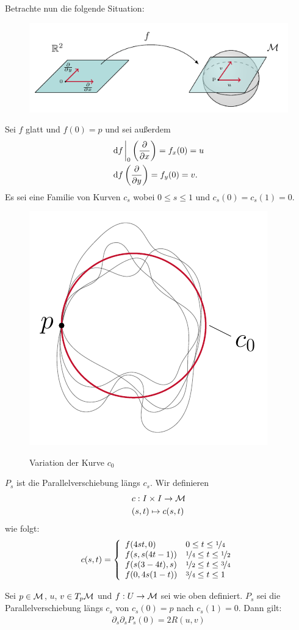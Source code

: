 Betrachte nun die folgende Situation:
\begin{figure}[H]
\centering
\includegraphics[width=1\linewidth]{figures/tikz/coordinates_r2_manifold.pdf}
\label{img:coordinates_r2_manifold}
\end{figure} 


Sei $f$ glatt und $f(0)=p$ und sei außerdem
\begin{align}
& \dd f \eval_0 \left( \pdv{x} \right) = f_x (0) = u\\
& \dd f \left( \pdv{y}\right) = f_y(0) = v.
\end{align}
Es sei eine Familie von Kurven $c_s$ wobei $0 \leq s \leq 1$ und $c_s (0) = c_s(1) = 0$.
\begin{figure}[H]
\centering
\includegraphics[width=0.4\linewidth]{figures/tikz/variantion_of_closed_curve.pdf}
\label{img:variantion_of_closed_curve}
\caption{Variation der Kurve $c_0$}
\end{figure} 

$P_s$ ist die Parallelverschiebung längs $c_s$.
Wir definieren
\begin{align}
&c : I \times I \to \mathcal{M}\\
&(s, t) \mapsto c(s,t)
\end{align}
wie folgt:
\begin{align}
c(s, t) = \left\{
\begin{array}{ll}
f(4 s t, 0) & 0 \leq t \leq \nicefrac{1}{4} \\
f(s, s(4t-1)) & \nicefrac{1}{4} \leq t \leq \nicefrac{1}{2}\\
f(s(3-4t), s) & \nicefrac{1}{2} \leq t \leq \nicefrac{3}{4}\\
f(0, 4s(1-t)) & \nicefrac{3}{4} \leq t \leq 1
\end{array}
\right. 
\end{align}
\begin{satz}
Sei $p \in \mathcal{M}$, $u$, $v \in T_p \mathcal{M}$ und $f: U \to \mathcal{M}$ sei wie oben definiert.
$P_s$ sei die Parallelverschiebung längs $c_s$ von $c_s(0) = p$ nach $c_s(1) = 0$.
Dann gilt:
\begin{align}
\partial_s \partial_s P_s(0) = 2 R (u, v)
\end{align}
\end{satz}

